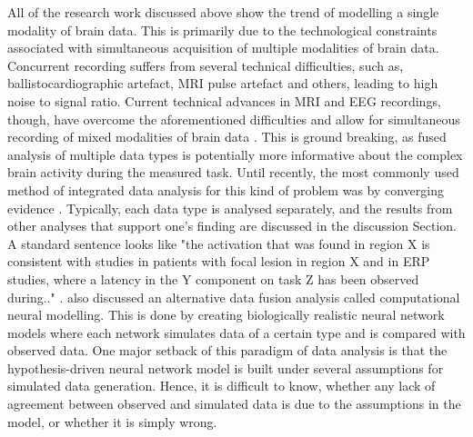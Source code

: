 All of the research work discussed above show the trend of modelling a single modality of brain data. This is primarily due to the technological constraints associated with simultaneous acquisition of multiple modalities of brain data. Concurrent recording suffers from several technical difficulties, such as, ballistocardiographic artefact, MRI pulse artefact and others, leading to high noise to signal ratio. Current technical advances in MRI and EEG recordings, though, have overcome the aforementioned difficulties and allow for simultaneous recording of mixed modalities of brain data \citep{menon2005combined, horovitz2002correlations}. This is ground breaking, as fused analysis of multiple data types is potentially more informative about the complex brain activity during the measured task. Until recently, the most commonly used method of integrated data analysis for this kind of problem was by converging evidence \citep{horwitz2002can}. Typically, each data type is analysed separately, and the results from other analyses that support one's finding are discussed in the discussion Section. A standard sentence looks like "the activation that was found in region X is consistent with studies in patients with focal lesion in region X and in ERP studies, where a latency in the Y component on task Z has been observed during.." \citep{horwitz2002can}. \citet{horwitz2002can} also discussed an alternative data fusion analysis called computational neural modelling. This is done by creating biologically realistic neural network models where each network simulates data of a certain type and is compared with observed data. One major setback of this paradigm of data analysis is that the hypothesis-driven neural network model is built under several assumptions for simulated data generation. Hence, it is difficult to know, whether any lack of agreement between observed and simulated data is due to the assumptions in the model, or whether it is simply wrong.

